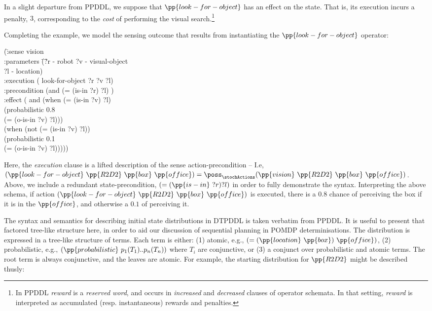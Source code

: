 \documentclass[letterpaper]{article}
\begin{document}
\noindent In a slight departure from PPDDL, we suppose that
$\pp{look-for-object}$ has an effect on the state. That is, its
execution incurs a penalty, $3$, corresponding to the {\em cost} of
performing the visual search.\footnote{In PPDDL {\em reward} is a {\em
reserved word}, and occurs in {\em increased} and {\em decreased}
clauses of operator schemata. In that setting, {\em reward} is
interpreted as accumulated (resp. instantaneous) rewards and
penalties.}

Completing the example, we model the sensing outcome that results from
instantiating the $\pp{look-for-object}$ operator:

\small{
\begin{tabtt}
(\= :sense vision \+\\
 :parameters \= (\= ?r - robot ?v - visual-object\\
 \>\>  ?l - location) \\
 :execution \> ( \> look-for-object ?r ?v ?l) \\
 :precondition (and (= (is-in ?r) ?l) ) \\
 :effect \>  (  \> and (when (= (is-in ?v) ?l) \\
   \> \> (probabilistic 0.8 \\
   \>  \>(= (o-is-in ?v) ?l))) \\
  \> (when (not (= (is-in ?v) ?l)) \\
   \>  \> (probabilistic 0.1 \\
   \>  \> (= (o-is-in ?v) ?l))))) \\
\end{tabtt}
}

\noindent Here, the {\em execution} clause is a lifted description of
the sense action-precondition -- I.e,
$(\pp{look-for-object}~\pp{R2D2}~\pp{box}~\pp{office}) =
\poss_\stochActions(\pp{vision}~\pp{R2D2}~\pp{box}~\pp{office})$. Above,
we include a redundant state-precondition, $(=(\pp{is-in}~?r)?l)$ in
order to fully demonstrate the syntax. Interpreting the above schema,
if action $(\pp{look-for-object}~\pp{R2D2}~\pp{box}~\pp{office})$ is
executed, there is a $0.8$ chance of perceiving the box if it is in
the $\pp{office}$, and otherwise a $0.1$ of perceiving it.


The syntax and semantics for describing initial state distributions in
DTPDDL is taken verbatim from PPDDL. It is useful to present that
factored tree-like structure here, in order to aid our discussion of
sequential planning in POMDP determinisations. The distribution is
expressed in a tree-like structure of terms. Each term is either: (1)
atomic, e.g., $(=(\pp{location}~\pp{box})~\pp{office})$, (2)
probabilistic, e.g., $(\pp{probabilistic}~p_1 (T_1) .. p_n (T_n))$
where $T_i$ are conjunctive, or (3) a conjunct over probabilistic and
atomic terms. The root term is always conjunctive, and the leaves are
atomic. For example, the starting distribution for $\pp{R2D2}$ might
be described thusly:
\end{document}

